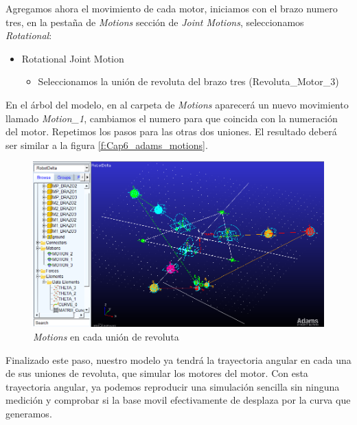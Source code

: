     Agregamos ahora el movimiento de cada motor, iniciamos con el brazo numero tres, en la pestaña de \textit{Motions} sección de \textit{Joint Motions}, seleccionamos \textit{Rotational}:
    
    \begin{scope}
        \renewcommand{\labelitemi}{\blacklozenge}
        \renewcommand{\labelitemii}{\checkmark}
        \begin{itemize}
            \item Rotational Joint Motion
            \begin{itemize}
                \item Seleccionamos la unión de revoluta del brazo tres (Revoluta\_Motor\_3)
                
            \end{itemize}
        \end{itemize}
    \end{scope}
    
    En el árbol del modelo, en al carpeta de \textit{Motions} aparecerá un nuevo movimiento llamado \textit{Motion\_1}, cambiamos el numero para que coincida con la numeración del motor. Repetimos los pasos para las otras dos uniones. El resultado deberá ser similar a la figura \eqref{f:Cap6_adams_motions}.
    
    \begin{figure}[H]
        \centering
        \includegraphics[width=1\linewidth]{Main/Chapter6/Images6/adams/motions/motions.png}
        \caption{\textit{Motions} en cada unión de revoluta}
        \label{f:Cap6_adams_motions}
    \end{figure}
    
    Finalizado este paso, nuestro modelo ya tendrá la trayectoria angular en cada una de sus uniones de revoluta, que simular los motores del motor. Con esta trayectoria angular, ya podemos reproducir una simulación sencilla sin ninguna medición y comprobar si la base movil efectivamente de desplaza por la curva que generamos.
    
